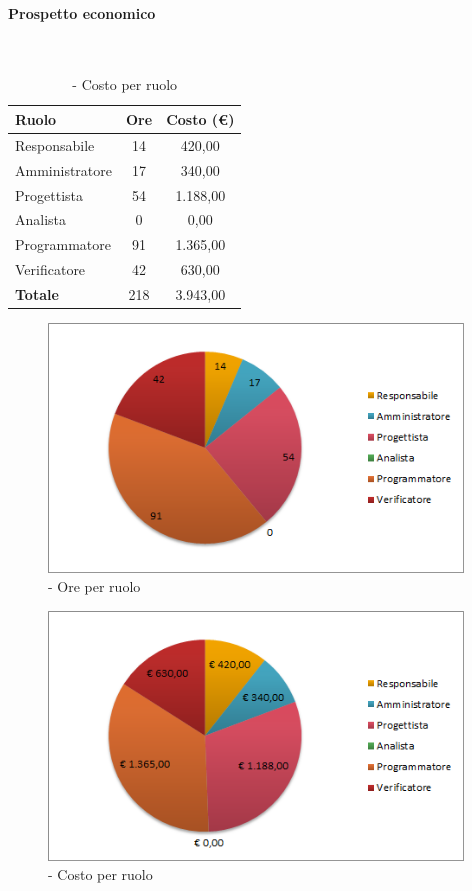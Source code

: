 \documentclass[./PianoDiProgetto.tex]{subfiles}
\begin{document}
	\paragraph{Prospetto economico}\

	\begin{table}[H]
		\centering

		\begin{tabular}{l * {2}{c}}
			\toprule
			\textbf{Ruolo} & \textbf{Ore} & \textbf{Costo (\euro{})} \\
			\midrule
			Responsabile & 14    &  420,00 \\
			Amministratore  & 17    &  340,00 \\
			Progettista  & 54   &  1.188,00 \\
			Analista & 0    &  0,00 \\
			Programmatore  & 91    &  1.365,00 \\
			Verificatore  & 42    &  630,00 \\
			\midrule
			\textbf{Totale}  & 218   &  3.943,00 \\
			\bottomrule
		\end{tabular}
		\caption{\PerC{} - Costo per ruolo}
	\end{table}

\vspace{35mm}

	\begin{figure}[H]
		\centering
		\includegraphics[width=11cm, trim=1cm 0cm 1cm 0cm]{grafici/C-ruolo}
			\caption{\PerC{} - Ore per ruolo}
	\end{figure}
\vfill
	\begin{figure}[H]
		\centering
		\includegraphics[width=11cm, trim=1cm 0cm 1cm 0cm]{grafici/C-costo}
			\caption{\PerC{} - Costo per ruolo}
	\end{figure}
\end{document}
